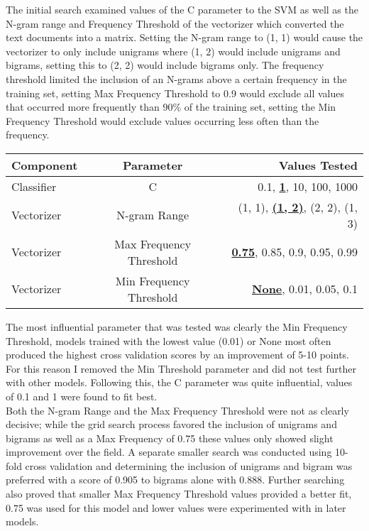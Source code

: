 \documentclass[11pt]{article}
\begin{document}
The initial search examined values of the C parameter to the SVM as well as the N-gram range and Frequency Threshold of the vectorizer which converted the text documents into a matrix. Setting the N-gram range to (1, 1) would cause the vectorizer to only include unigrams where (1, 2) would include unigrams and bigrams, setting this to (2, 2) would include bigrams only. The frequency threshold limited the inclusion of an N-grams above a certain frequency in the training set, setting Max Frequency Threshold to 0.9 would exclude all values that occurred more frequently than 90\% of the training set, setting the Min Frequency Threshold would exclude values occurring less often than the frequency.

\begin{center}
	 \label{params_lin}
	\begin{tabular}{ l | c | r } \hline
	Component & Parameter  & Values Tested\\ \hline
	Classifier &	C 				& 0.1, \textbf{\underline{1}}, 10, 100, 1000 \\
	Vectorizer &	N-gram Range 	& (1, 1), \textbf{\underline{(1, 2)}}, (2, 2), (1, 3) \\
	Vectorizer & 	Max Frequency Threshold	& 	\textbf{\underline{0.75}}, 0.85, 0.9, 0.95, 0.99\\
	Vectorizer &	Min Frequency Threshold &	\textbf{\underline{None}}, 0.01, 0.05, 0.1\\
	\end{tabular}
\end{center}

The most influential parameter that was tested was clearly the Min Frequency Threshold, models trained with the lowest value (0.01) or None most often produced the highest cross validation scores by an improvement of 5-10 points. For this reason I removed the Min Threshold parameter and did not test further with other models. Following this, the C parameter was quite influential, values of 0.1 and 1 were found to fit best.\\

Both the N-gram Range and the Max Frequency Threshold were not as clearly decisive; while the grid search process favored the inclusion of unigrams and bigrams as well as a Max Frequency of 0.75 these values only showed slight improvement over the field. A separate smaller search was conducted using 10-fold cross validation and determining the inclusion of unigrams and bigram was preferred with a score of 0.905 to bigrams alone with 0.888. Further searching also proved that smaller Max Frequency Threshold values provided a better fit, 0.75 was used for this model and lower values were experimented with in later models.
\end{document}
